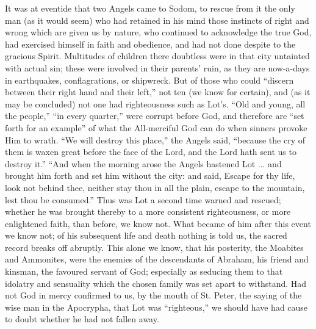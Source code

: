 It was at eventide that two Angels came to Sodom, to rescue from it
the only man (as it would seem) who had retained in his mind those
instincts of right and wrong which are given us by nature, who
continued to acknowledge the true God, had exercised himself in faith
and obedience, and had not done despite to the gracious Spirit.
Multitudes of children there doubtless were in that city untainted
with actual sin; these were involved in their parents' ruin, as they
are now-a-days in earthquakes, conflagrations, or shipwreck. But of
those who could ``discern between their right hand and their
left,'' not ten (we know for certain), and (as it may be
concluded) not one had righteousness such as Lot's. ``Old and
young, all the people,'' ``in every quarter,'' were
corrupt before God, and therefore are ``set forth for an
example'' of what the All-merciful God can do when sinners provoke
Him to wrath. ``We will destroy this place,'' the Angels said,
``because the cry of them is waxen great before the face of the
Lord, and the Lord hath sent us to destroy it.'' ``And when
the morning arose the Angels hastened Lot ... and brought him forth
and set him without the city: and said, Escape for thy life, look not
behind thee, neither stay thou in all the plain, escape to the
mountain, lest thou be consumed.'' Thus was Lot a second time
warned and rescued; whether he was brought thereby to a more
consistent righteousness, or more enlightened faith, than before, we
know not. What became of him after this event we know not; of his
subsequent life and death nothing is told us, the sacred record breaks
off abruptly. This alone we know, that his posterity, the Moabites and
Ammonites, were the enemies of the descendants of Abraham, his friend
and kinsman, the favoured servant of God; especially as seducing them
to that idolatry and sensuality which the chosen family was set apart
to withstand. Had not God in mercy confirmed to us, by the mouth of
St. Peter, the saying of the wise man in the Apocrypha, that Lot was
``righteous,'' we should have had cause to doubt whether he
had not fallen away.

